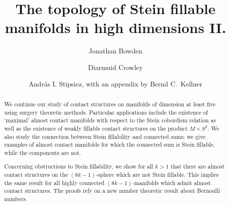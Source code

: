 \documentclass[12pt]{amsart}
\theoremstyle{remark}
\begin{document}
\title[The topology of Stein fillable manifolds in high dimensions II.]{The topology of Stein fillable manifolds in high dimensions II.}

\author[Bowden]{Jonathan Bowden}
\address{Mathematisches Institut, Universit\"{a}t Augsburg, Universit\"{a}tstr 14, 86159 Augsburg, Germany}
\author[Crowley]{Diarmuid Crowley}
\address{Intitute of Mathematics, University of Aberdeen, Aberdeen AB24 3UE, United Kingdom}
\author[Stipsicz]{Andr\'{a}s I. Stipsicz, with an appendix by Bernd C.~Kellner}
\address{ R\'{e}nyi Institute of Mathematics, Re\'{a}ltanoda u.~13-15., Budapest, Hungary H-1053}
\address{Mathematisches Institut, Universit\"{a}t G\"{o}ttingen, Bunsenstr.\ 3–-5, 37073 G\"{o}ttingen, Germany}






\maketitle

\begin{abstract}
We continue our study of contact structures on manifolds of dimension
at least five using surgery theoretic methods.  Particular
applications include the existence of `maximal' almost contact
manifolds with respect to the Stein cobordism relation as well as the
existence of weakly fillable contact structures on the product
$M\times S^2$. 
We also study
the connection between Stein fillability and connected sums: we give
examples of almost contact manifolds for which the connected sum is
Stein fillable, while the components are not.

Concerning obstructions to Stein fillability, we show for all $k >1$
that there are almost contact structures on the $(8k{-}1)$-sphere
which are not Stein fillable.  This implies the same result for all
highly connected $(8k{-}1)$-manifolds which admit almost contact
structures.  The proofs rely on a new number theoretic result about
Bernoulli numbers.
\end{abstract}
\end{document}
